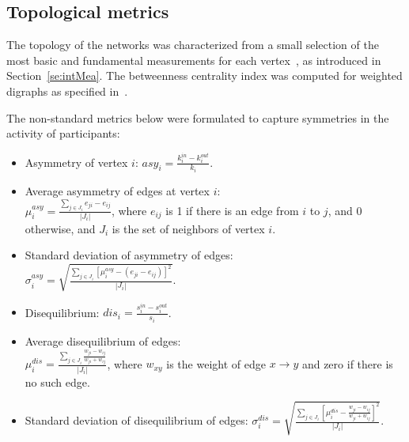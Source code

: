 
\subsection{Topological metrics}\label{measures}

The topology of the networks was characterized 
from a small selection of the most basic 
and fundamental measurements for each vertex~\cite{newmanBook},
as introduced in Section~\ref{se:intMea}.
The betweenness centrality index was computed for weighted digraphs as specified in~\cite{faster}.

The non-standard metrics below were formulated to capture symmetries in the activity of participants:

\begin{itemize}
\item Asymmetry of vertex $i$: $asy_i=\frac{k_i^{in}-k_i^{out}}{k_i}$.
\item Average asymmetry of edges at vertex $i$:\\ $\mu_i^{asy}=\frac{\sum_{j\in J_i} e_{ji}-e_{ij}}{|J_i|}$, where $e_{ij}$ is 1 if there is an edge from $i$ to $j$, and $0$ otherwise, and $J_i$ is the set of neighbors of vertex $i$.
\item Standard deviation of asymmetry of edges:\\ $\sigma_i^{asy}=\sqrt{\frac{\sum_{j\in J_i}[\mu^{asy}_i -(e_{ji}-e_{ij}) ]^2  }{|J_i|}  }$.
\item Disequilibrium: $dis_i=\frac{s_i^{in}-s_i^{out}}{s_i}$.
\item Average disequilibrium of edges:\\ $\mu_i^{dis}=\frac{\sum_{j \in J_i}\frac{w_{ji}-w_{ij}}{w_{ji}+w_{ij}}}{|J_i|}$, where $w_{xy}$ is the weight of edge $x\rightarrow y$ and zero if there is no such edge.
\item Standard deviation of disequilibrium of edges: $\sigma_i^{dis}=\sqrt{\frac{\sum_{j\in J_i}\left[\mu^{dis}_i-\frac{w_{ji}-w_{ij}}{w_{ji}+w_{ij}}\right]^2}{|J_i|}}$.
\end{itemize}

